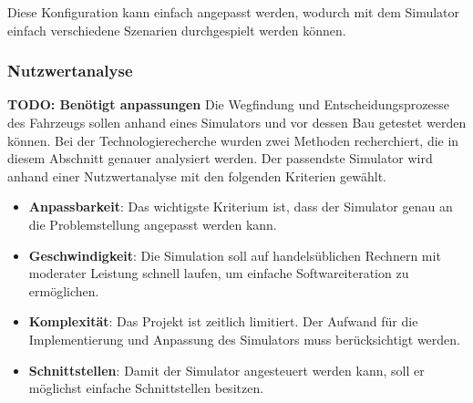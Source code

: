 \documentclass[../main.tex]{subfiles}
\begin{document}
Diese Konfiguration kann einfach angepasst werden, wodurch mit dem Simulator einfach verschiedene Szenarien durchgespielt werden können.


\subsubsection{Nutzwertanalyse}
\textbf{TODO: Benötigt anpassungen}
Die Wegfindung und Entscheidungsprozesse des Fahrzeugs sollen anhand eines Simulators und vor dessen Bau getestet werden können. Bei der Technologierecherche wurden zwei Methoden recherchiert, die in diesem Abschnitt genauer analysiert werden.
Der passendste Simulator wird anhand einer Nutzwertanalyse mit den folgenden Kriterien gewählt.

\begin{itemize}
\item \textbf{Anpassbarkeit}: Das wichtigste Kriterium ist, dass der Simulator genau an die Problemstellung angepasst werden kann.
\item \textbf{Geschwindigkeit}: Die Simulation soll auf handelsüblichen Rechnern mit moderater Leistung schnell laufen, um einfache Softwareiteration zu ermöglichen.  
\item \textbf{Komplexität}: Das Projekt ist zeitlich limitiert. Der Aufwand für die Implementierung und Anpassung des Simulators muss berücksichtigt werden.
\item \textbf{Schnittstellen}: Damit der Simulator angesteuert werden kann, soll er möglichst einfache Schnittstellen besitzen.
\end{itemize}
\end{document}
